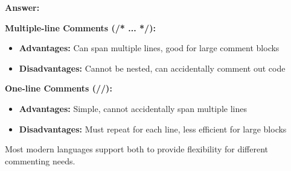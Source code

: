 \documentclass[11pt,a4paper]{article}
\begin{document}
\textbf{Answer:}

\textbf{Multiple-line Comments (/* ... */):}
\begin{itemize}
\item \textbf{Advantages:} Can span multiple lines, good for large comment blocks
\item \textbf{Disadvantages:} Cannot be nested, can accidentally comment out code
\end{itemize}

\textbf{One-line Comments (//):}
\begin{itemize}
\item \textbf{Advantages:} Simple, cannot accidentally span multiple lines
\item \textbf{Disadvantages:} Must repeat for each line, less efficient for large blocks
\end{itemize}

Most modern languages support both to provide flexibility for different commenting needs.
\end{document}
